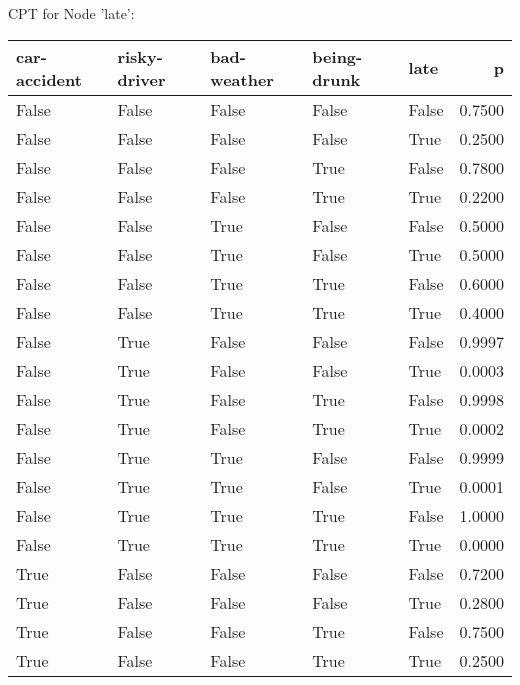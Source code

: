 
CPT for Node 'late':

\begin{tabular}{lllllr}
\toprule
 car-accident &  risky-driver &  bad-weather &  being-drunk &  late &      p \\
\midrule
        False &         False &        False &        False & False & 0.7500 \\
        False &         False &        False &        False &  True & 0.2500 \\
        False &         False &        False &         True & False & 0.7800 \\
        False &         False &        False &         True &  True & 0.2200 \\
        False &         False &         True &        False & False & 0.5000 \\
        False &         False &         True &        False &  True & 0.5000 \\
        False &         False &         True &         True & False & 0.6000 \\
        False &         False &         True &         True &  True & 0.4000 \\
        False &          True &        False &        False & False & 0.9997 \\
        False &          True &        False &        False &  True & 0.0003 \\
        False &          True &        False &         True & False & 0.9998 \\
        False &          True &        False &         True &  True & 0.0002 \\
        False &          True &         True &        False & False & 0.9999 \\
        False &          True &         True &        False &  True & 0.0001 \\
        False &          True &         True &         True & False & 1.0000 \\
        False &          True &         True &         True &  True & 0.0000 \\
         True &         False &        False &        False & False & 0.7200 \\
         True &         False &        False &        False &  True & 0.2800 \\
         True &         False &        False &         True & False & 0.7500 \\
         True &         False &        False &         True &  True & 0.2500 \\

\end{tabular}
